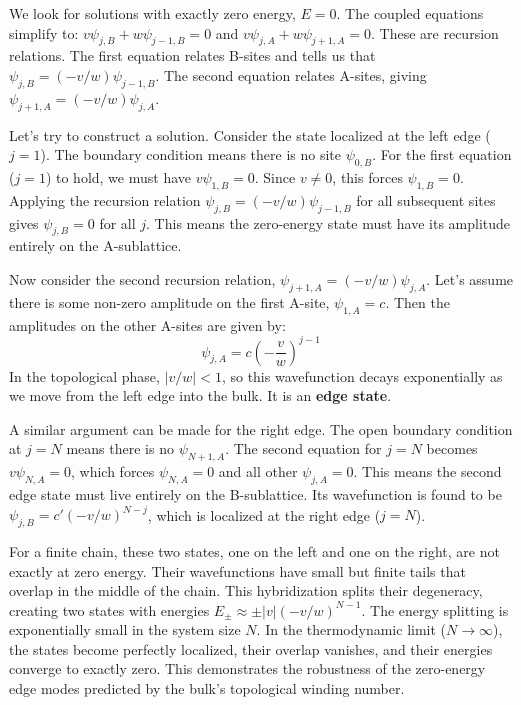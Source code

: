 \begin{solution}
    We look for solutions with exactly zero energy, $E=0$. The coupled equations simplify to:
    $v \psi_{j,B} + w \psi_{j-1, B} = 0$ and $v \psi_{j,A} + w \psi_{j+1, A} = 0$. 
    These are recursion relations. The first equation relates B-sites and tells us that $\psi_{j,B} = (-v/w) \psi_{j-1, B}$. The second equation relates A-sites, giving $\psi_{j+1,A} = (-v/w) \psi_{j,A}$.
    
    Let's try to construct a solution.
    Consider the state localized at the left edge ($j=1$). The boundary condition means there is no site $\psi_{0,B}$. For the first equation ($j=1$) to hold, we must have $v\psi_{1,B} = 0$. Since $v \neq 0$, this forces $\psi_{1,B}=0$. Applying the recursion relation $\psi_{j,B} = (-v/w) \psi_{j-1, B}$ for all subsequent sites gives $\psi_{j,B}=0$ for all $j$. This means the zero-energy state must have its amplitude entirely on the A-sublattice.
    
    Now consider the second recursion relation, $\psi_{j+1,A} = (-v/w) \psi_{j,A}$. Let's assume there is some non-zero amplitude on the first A-site, $\psi_{1,A} = c$. Then the amplitudes on the other A-sites are given by:
    \begin{equation*}
        \psi_{j,A} = c \left(-\frac{v}{w}\right)^{j-1}
    \end{equation*}
    In the topological phase, $|v/w| < 1$, so this wavefunction decays exponentially as we move from the left edge into the bulk. It is an \textbf{edge state}.
    
    A similar argument can be made for the right edge. The open boundary condition at $j=N$ means there is no $\psi_{N+1,A}$. The second equation for $j=N$ becomes $v\psi_{N,A}=0$, which forces $\psi_{N,A}=0$ and all other $\psi_{j,A}=0$. This means the second edge state must live entirely on the B-sublattice. Its wavefunction is found to be $\psi_{j,B} = c'(-v/w)^{N-j}$, which is localized at the right edge ($j=N$).
    
    For a finite chain, these two states, one on the left and one on the right, are not exactly at zero energy. Their wavefunctions have small but finite tails that overlap in the middle of the chain. This hybridization splits their degeneracy, creating two states with energies $E_\pm \approx \pm |v|(-v/w)^{N-1}$.
    The energy splitting is exponentially small in the system size $N$. In the thermodynamic limit ($N \to \infty$), the states become perfectly localized, their overlap vanishes, and their energies converge to exactly zero. This demonstrates the robustness of the zero-energy edge modes predicted by the bulk's topological winding number.
\end{solution}
